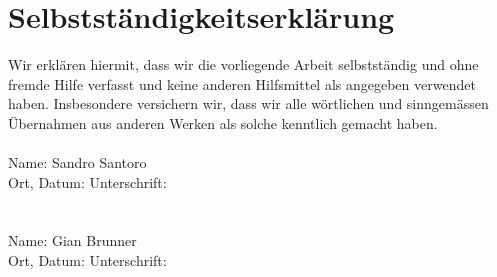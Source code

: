 \chapter{Selbstständigkeitserklärung}
\label{sec:erklaerung}
\vspace{0 cm}
Wir erklären hiermit, dass wir die vorliegende Arbeit selbstständig und ohne fremde Hilfe verfasst und keine anderen Hilfsmittel als angegeben verwendet haben. Insbesondere versichern wir, dass wir alle wörtlichen und sinngemässen Übernahmen aus anderen Werken als solche kenntlich gemacht haben.
\\
\\
Name: Sandro Santoro
\\	
Ort, Datum: \hspace{4cm}Unterschrift:
\\
\\
\\
Name: Gian Brunner
\\
Ort, Datum: \hspace{4cm}Unterschrift:
\\
\\





